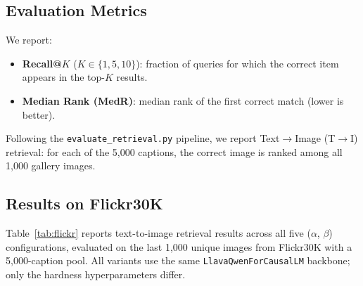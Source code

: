 \documentclass[10pt,twocolumn,letterpaper]{article}
\begin{document}
\subsection{Evaluation Metrics}

We report:
\begin{itemize}
  \item \textbf{Recall@$K$} ($K \in \{1, 5, 10\}$): fraction of queries for which the correct item appears in the top-$K$ results.
  \item \textbf{Median Rank (MedR)}: median rank of the first correct match (lower is better).
\end{itemize}

Following the \texttt{evaluate\_retrieval.py} pipeline, we report Text$\to$Image (T$\to$I) retrieval: for each of the 5{,}000 captions, the correct image is ranked among all 1{,}000 gallery images.

\subsection{Results on Flickr30K}

Table~\ref{tab:flickr} reports text-to-image retrieval results across all five ($\alpha$, $\beta$) configurations, evaluated on the last 1{,}000 unique images from Flickr30K with a 5{,}000-caption pool.
All variants use the same \texttt{LlavaQwenForCausalLM} backbone; only the hardness hyperparameters differ.

\begin{table}[h]
\centering
\caption{Text$\to$Image retrieval on Flickr30K (1K images, 5K captions). R@$K$ (\%) higher is better; MedR lower is better. Bold = best.}
\label{tab:flickr}
\end{table}
\end{document}
